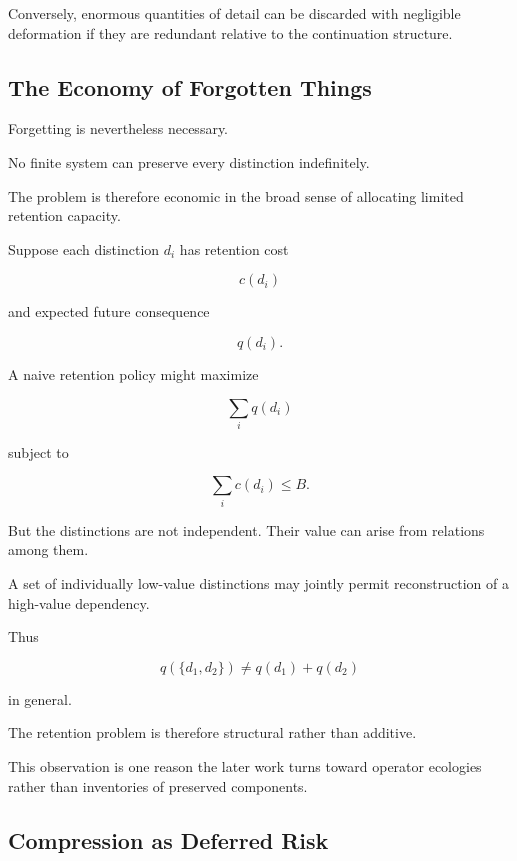 \documentclass[11pt]{article}
\theoremstyle{remark}
\begin{document}
Conversely, enormous quantities of detail can be discarded with negligible deformation if they are redundant relative to the continuation structure.

\subsection{The Economy of Forgotten Things}

Forgetting is nevertheless necessary.

No finite system can preserve every distinction indefinitely.

The problem is therefore economic in the broad sense of allocating limited retention capacity.

Suppose each distinction $d_i$ has retention cost

\begin{equation}
c(d_i)
\end{equation}

and expected future consequence

\begin{equation}
q(d_i).
\end{equation}

A naive retention policy might maximize

\begin{equation}
\sum_i q(d_i)
\end{equation}

subject to

\begin{equation}
\sum_i c(d_i)\leq B.
\end{equation}

But the distinctions are not independent. Their value can arise from relations among them.

A set of individually low-value distinctions may jointly permit reconstruction of a high-value dependency.

Thus

\begin{equation}
q(\{d_1,d_2\})
\neq
q(d_1)+q(d_2)
\end{equation}

in general.

The retention problem is therefore structural rather than additive.

This observation is one reason the later work turns toward operator ecologies rather than inventories of preserved components.

\subsection{Compression as Deferred Risk}
\end{document}
